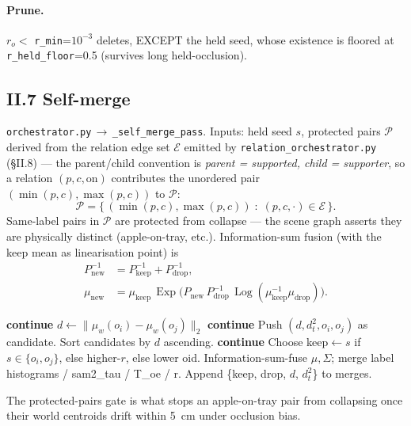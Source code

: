\documentclass[11pt]{article}
\DeclareMathOperator{\Exp}{Exp}
\DeclareMathOperator{\Log}{Log}
\newcommand{\file}[1]{\texttt{#1}}
\begin{document}
\paragraph{Prune.}
$r_o < $ \texttt{r\_min}=$10^{-3}$ deletes, EXCEPT the held seed, whose
existence is floored at \texttt{r\_held\_floor}=0.5 (survives long
held-occlusion).

\subsection*{II.7 Self-merge}

\file{orchestrator.py}\,$\to$\,\texttt{\_self\_merge\_pass}. Inputs:
held seed $s$, protected pairs $\mathcal P$ derived from the relation
edge set $\mathcal E$ emitted by \file{relation\_orchestrator.py}
(\S II.8) — the parent/child convention is
\emph{parent = supported, child = supporter}, so a relation
$(p,c,\text{on})$ contributes the unordered pair
$(\min(p,c),\max(p,c))$ to $\mathcal P$:
\begin{equation*}
\mathcal{P} = \bigl\{\,(\min(p,c),\max(p,c))\;:\;(p,c,\cdot)\in\mathcal{E}\,\bigr\}.
\end{equation*}
Same-label pairs in $\mathcal P$ are protected from collapse — the scene
graph asserts they are physically distinct (apple-on-tray, etc.).
Information-sum fusion (with the keep mean as linearisation point) is
\begin{equation}\label{eq:self_merge_info}
\begin{aligned}
P^{-1}_{\text{new}} &= P^{-1}_{\text{keep}} + P^{-1}_{\text{drop}}, \\
\mu_{\text{new}} &= \mu_{\text{keep}}\,\Exp\!\bigl(P_{\text{new}}\,P^{-1}_{\text{drop}}\,\Log(\mu_{\text{keep}}^{-1}\mu_{\text{drop}})\bigr).
\end{aligned}
\end{equation}

\begin{algorithm}[H]
\caption{Self-merge pass.}
\begin{algorithmic}[1]
   \textbf{continue} \EndIf
  \State $d \gets \|\mu_w(o_i) - \mu_w(o_j)\|_2$
   \textbf{continue} \EndIf
  \State Push $(d, d^2_t, o_i, o_j)$ as candidate.
\EndFor
\State Sort candidates by $d$ ascending.
   \textbf{continue} \EndIf
  \State Choose keep$\gets s$ if $s\in\{o_i,o_j\}$, else higher-$r$, else lower oid.
  \State Information-sum-fuse $\mu, \Sigma$; merge label histograms / sam2\_tau / T\_oe / r.
  \State Append \{keep, drop, $d$, $d^2_t$\} to merges.
\EndFor
\end{algorithmic}
\end{algorithm}
The protected-pairs gate is what stops an apple-on-tray pair from
collapsing once their world centroids drift within 5~cm under
occlusion bias.
\end{document}
